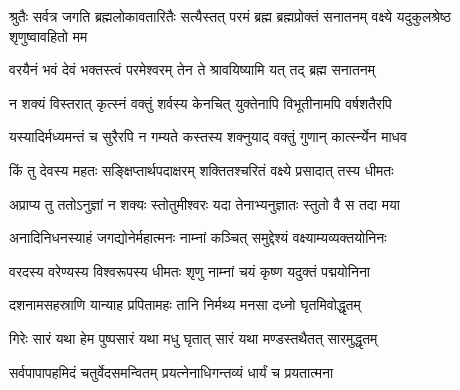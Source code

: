 \threelineshloka
{श्रुतैः सर्वत्र जगति ब्रह्मलोकावतारितैः}
{सत्यैस्तत् परमं ब्रह्म ब्रह्मप्रोक्तं सनातनम्}
{वक्ष्ये यदुकुलश्रेष्ठ शृणुष्वावहितो मम}%

\twolineshloka
{वरयैनं भवं देवं भक्तस्त्वं परमेश्वरम्}
{तेन ते श्रावयिष्यामि यत् तद् ब्रह्म सनातनम्}%

\twolineshloka
{न शक्यं विस्तरात् कृत्स्नं वक्तुं शर्वस्य केनचित्}
{युक्तेनापि विभूतीनामपि वर्षशतैरपि}%

\twolineshloka
{यस्यादिर्मध्यमन्तं च सुरैरपि न गम्यते}
{कस्तस्य शक्नुयाद् वक्तुं गुणान् कार्त्स्न्येन माधव}%

\twolineshloka
{किं तु देवस्य महतः सङ्क्षिप्तार्थपदाक्षरम्}
{शक्तितश्चरितं वक्ष्ये प्रसादात् तस्य धीमतः}%

\twolineshloka
{अप्राप्य तु ततोऽनुज्ञां न शक्यः स्तोतुमीश्वरः}
{यदा तेनाभ्यनुज्ञातः स्तुतो वै स तदा मया}%

\twolineshloka
{अनादिनिधनस्याहं जगद्योनेर्महात्मनः}
{नाम्नां कञ्चित् समुद्देश्यं वक्ष्याम्यव्यक्तयोनिनः}%

\twolineshloka
{वरदस्य वरेण्यस्य विश्वरूपस्य धीमतः}
{शृणु नाम्नां चयं कृष्ण यदुक्तं पद्मयोनिना}%

\twolineshloka
{दशनामसहस्राणि यान्याह प्रपितामहः}
{तानि निर्मथ्य मनसा दध्नो घृतमिवोद्धृतम्}%

\twolineshloka
{गिरेः सारं यथा हेम पुष्पसारं यथा मधु}
{घृतात् सारं यथा मण्डस्तथैतत् सारमुद्धृतम्}%

\twolineshloka
{सर्वपापापहमिदं चतुर्वेदसमन्वितम्}
{प्रयत्नेनाधिगन्तव्यं धार्यं च प्रयतात्मना}%


